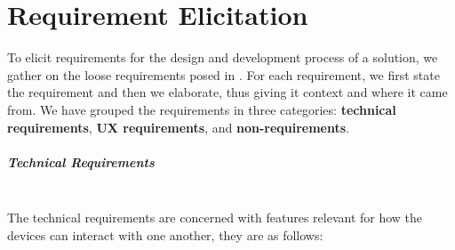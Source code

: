 \chapter{Requirement Elicitation}\label{cha:requirement_elicitation}
To elicit requirements for the design and development process of a solution, we gather on the loose requirements posed in .
For each requirement, we first state the requirement and then we elaborate, thus giving it context and where it came from.
We have grouped the requirements in three categories: \textbf{technical requirements}, \textbf{\ac{UX} requirements}, and \textbf{non-requirements}.

\paragraph{Technical Requirements} \hfill\\
The technical requirements are concerned with features relevant for how the devices can interact with one another, they are as follows:
